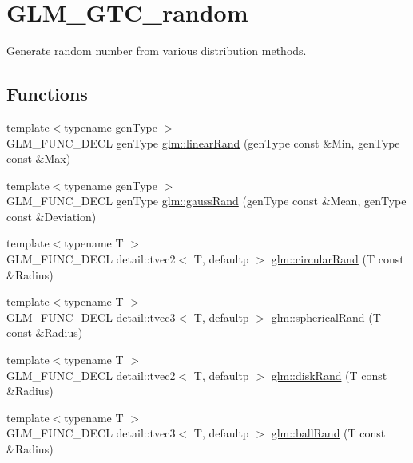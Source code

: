 \hypertarget{group__gtc__random}{}\section{G\+L\+M\+\_\+\+G\+T\+C\+\_\+random}
\label{group__gtc__random}


Generate random number from various distribution methods.  


\subsection*{Functions}
\begin{DoxyCompactItemize}
\item 
{\footnotesize template$<$typename gen\+Type $>$ }\\G\+L\+M\+\_\+\+F\+U\+N\+C\+\_\+\+D\+E\+CL gen\+Type \hyperlink{group__gtc__random_ga310c2e65883e62a4405128f187f41f27}{glm\+::linear\+Rand} (gen\+Type const \&Min, gen\+Type const \&Max)
\item 
{\footnotesize template$<$typename gen\+Type $>$ }\\G\+L\+M\+\_\+\+F\+U\+N\+C\+\_\+\+D\+E\+CL gen\+Type \hyperlink{group__gtc__random_gacba09f5b8e1e8eac3d318ae6426bbd26}{glm\+::gauss\+Rand} (gen\+Type const \&Mean, gen\+Type const \&Deviation)
\item 
{\footnotesize template$<$typename T $>$ }\\G\+L\+M\+\_\+\+F\+U\+N\+C\+\_\+\+D\+E\+CL detail\+::tvec2$<$ T, defaultp $>$ \hyperlink{group__gtc__random_gac1ab03c2c797ce352fd74cdb5229b151}{glm\+::circular\+Rand} (T const \&Radius)
\item 
{\footnotesize template$<$typename T $>$ }\\G\+L\+M\+\_\+\+F\+U\+N\+C\+\_\+\+D\+E\+CL detail\+::tvec3$<$ T, defaultp $>$ \hyperlink{group__gtc__random_ga8a9eee1fcb08690881ead242fe4259dc}{glm\+::spherical\+Rand} (T const \&Radius)
\item 
{\footnotesize template$<$typename T $>$ }\\G\+L\+M\+\_\+\+F\+U\+N\+C\+\_\+\+D\+E\+CL detail\+::tvec2$<$ T, defaultp $>$ \hyperlink{group__gtc__random_ga7d24fc3ef13fd7b6cad7e7b870b0e322}{glm\+::disk\+Rand} (T const \&Radius)
\item 
{\footnotesize template$<$typename T $>$ }\\G\+L\+M\+\_\+\+F\+U\+N\+C\+\_\+\+D\+E\+CL detail\+::tvec3$<$ T, defaultp $>$ \hyperlink{group__gtc__random_gac9c6e44b013874c291547f568d240500}{glm\+::ball\+Rand} (T const \&Radius)
\end{DoxyCompactItemize}


